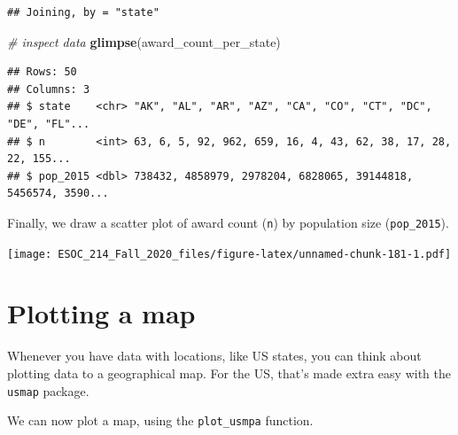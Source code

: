 \documentclass[
]{book}
\newenvironment{Shaded}{\begin{snugshade}}{\end{snugshade}}
\newcommand{\CommentTok}[1]{\textcolor[rgb]{0.56,0.35,0.01}{\textit{#1}}}
\newcommand{\DataTypeTok}[1]{\textcolor[rgb]{0.13,0.29,0.53}{#1}}
\newcommand{\DecValTok}[1]{\textcolor[rgb]{0.00,0.00,0.81}{#1}}
\newcommand{\KeywordTok}[1]{\textcolor[rgb]{0.13,0.29,0.53}{\textbf{#1}}}
\newcommand{\NormalTok}[1]{#1}
\newcommand{\OperatorTok}[1]{\textcolor[rgb]{0.81,0.36,0.00}{\textbf{#1}}}
\newcommand{\StringTok}[1]{\textcolor[rgb]{0.31,0.60,0.02}{#1}}
\begin{document}
\begin{verbatim}
## Joining, by = "state"
\end{verbatim}

\begin{Shaded}
\begin{Highlighting}[]
\CommentTok{# inspect data}
\KeywordTok{glimpse}\NormalTok{(award_count_per_state)}
\end{Highlighting}
\end{Shaded}

\begin{verbatim}
## Rows: 50
## Columns: 3
## $ state    <chr> "AK", "AL", "AR", "AZ", "CA", "CO", "CT", "DC", "DE", "FL"...
## $ n        <int> 63, 6, 5, 92, 962, 659, 16, 4, 43, 62, 38, 17, 28, 22, 155...
## $ pop_2015 <dbl> 738432, 4858979, 2978204, 6828065, 39144818, 5456574, 3590...
\end{verbatim}

Finally, we draw a scatter plot of award count (\texttt{n}) by population size (\texttt{pop\_2015}).

\begin{Shaded}
\end{Shaded}

\texttt{[image: ESOC\_214\_Fall\_2020\_files/figure-latex/unnamed-chunk-181-1.pdf]}

\hypertarget{plotting-a-map}{%
\section{Plotting a map}\label{plotting-a-map}}

Whenever you have data with locations, like US states, you can think about plotting data to a geographical map. For the US, that's made extra easy with the \texttt{usmap} package.

We can now plot a map, using the \texttt{plot\_usmpa} function.

\begin{Shaded}
\end{Shaded}
\end{document}
